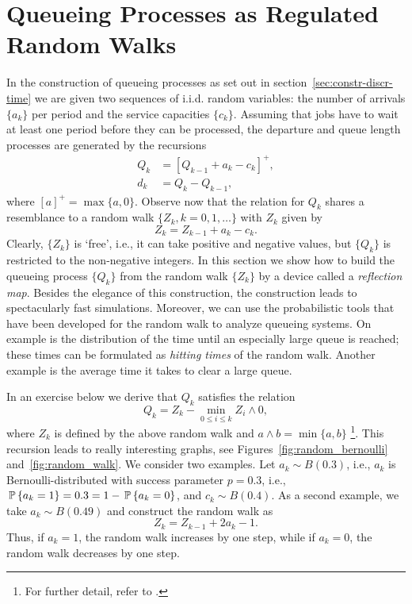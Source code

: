 \section{Queueing Processes as Regulated Random Walks}
\label{sec:queu-proc-as}

In the construction of queueing processes as set out in
section~\ref{sec:constr-discr-time} we are given two sequences of
i.i.d. random variables: the number of arrivals $\{a_k\}$ per period
and the service capacities $\{c_k\}$. Assuming that jobs have to wait
at least one period before they can be processed, the departure and
queue length processes are generated by the recursions
\begin{align*}
  Q_k &= [Q_{k-1}+a_k - c_k]^+,\\
  d_k &= Q_k - Q_{k-1},
\end{align*}
where $[a]^+ = \max\{a, 0\}$.  Observe now that the relation for $Q_k$
shares a resemblance to a random walk $\{Z_k, k=0,1,\ldots\}$ with  $Z_k$ 
given by
\begin{equation*}
  Z_k = Z_{k-1} + a_k - c_k.
\end{equation*}
Clearly, $\{Z_k\}$ is `free', i.e., it can take positive and negative
values, but $\{Q_k\}$ is restricted to the non-negative integers.  In
this section we show how to build the queueing process $\{Q_k\}$ from
the random walk $\{Z_k\}$ by a device called a \emph{reflection map}.
Besides the elegance of this construction, the construction leads to
spectacularly fast simulations. Moreover, we can use the probabilistic
tools that have been developed for the random walk to analyze queueing
systems. On example is the distribution of the time until an
especially large queue is reached; these times can be formulated as
\emph{hitting times} of the random walk. Another example is the
average time it takes to clear a large queue.

In an exercise  below we derive that $Q_k$ satisfies the relation
\begin{equation}\label{eq:reich1}
  Q_k = Z_k - \min_{0\leq i \leq k} Z_i\wedge 0,
\end{equation}
where $Z_k$ is defined by the above random walk and
$a\wedge b = \min\{a,b\}$ \footnote{For further detail, refer to
  \citet{baccelli88:_sampl_m_m}.}.  This recursion leads to really
interesting graphs, see Figures~\ref{fig:random_bernoulli}
and~\ref{fig:random_walk}. We consider two examples. Let
$a_k \sim B(0.3)$, i.e., $a_k$ is Bernoulli-distributed with success
parameter $p=0.3$, i.e., $\P{a_k = 1} = 0.3 = 1- \P{a_k=0}$, and
$c_k \sim B(0.4)$. As a second example, we take $a_k\sim B(0.49)$ and
construct the random walk as
\begin{equation*}
  Z_k = Z_{k-1} + 2 a_k -1.
\end{equation*}
Thus, if $a_k=1$, the random walk increases by one step, while if
$a_k=0$, the random walk decreases by one step. 


